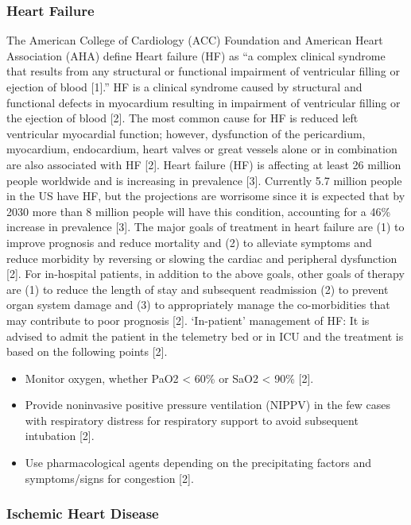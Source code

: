 \subsubsection{Heart Failure} %
The American College of Cardiology (ACC) Foundation and American Heart Association (AHA) define Heart failure (HF) as “a complex clinical syndrome that results from any structural or functional impairment of ventricular filling or ejection of blood [1].” HF is a clinical syndrome caused by structural and functional defects in myocardium resulting in impairment of ventricular filling or the ejection of blood [2]. The most common cause for HF is reduced left ventricular myocardial function; however, dysfunction of the pericardium, myocardium, endocardium, heart valves or great vessels alone or in combination are also associated with HF [2].
Heart failure (HF) is affecting at least 26 million people worldwide and is increasing in prevalence [3]. Currently 5.7 million people in the US have HF, but the projections are worrisome since it is expected that by 2030 more than 8 million people will have this condition, accounting for a 46\% increase in prevalence [3].
The major goals of treatment in heart failure are (1) to improve prognosis and reduce mortality and (2) to alleviate symptoms and reduce morbidity by reversing or slowing the cardiac and peripheral dysfunction [2]. For in-hospital patients, in addition to the above goals, other goals of therapy are (1) to reduce the length of stay and subsequent readmission (2) to prevent organ system damage and (3) to appropriately manage the co-morbidities that may contribute to poor prognosis [2].
‘In-patient’ management of HF: It is advised to admit the patient in the telemetry bed or in ICU and the treatment is based on the following points [2].
\begin{itemize}
    \item Monitor oxygen, whether PaO2 < 60\% or SaO2 < 90\% [2].
    \item Provide noninvasive positive pressure ventilation (NIPPV) in the few cases with respiratory distress for respiratory support to avoid subsequent intubation [2].
    \item Use pharmacological agents depending on the precipitating factors and symptoms/signs for congestion [2].
\end{itemize}

\subsubsection{Ischemic Heart Disease}

